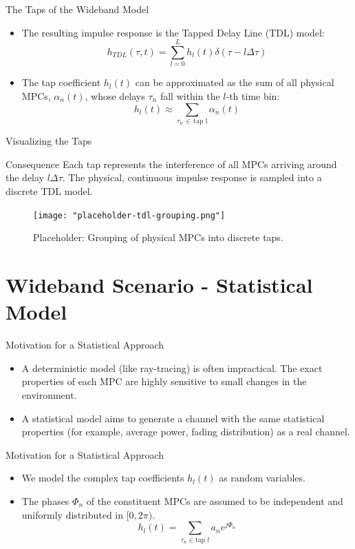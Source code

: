 \documentclass{beamer}
\begin{document}
	\begin{frame}{The Taps of the Wideband Model}
		\begin{itemize}
			\item The resulting impulse response is the Tapped Delay Line (TDL) model:
			\[ h_{TDL}(\tau, t) = \sum_{l=0}^{L} h_l(t) \delta(\tau - l\Delta\tau) \]
			
			\item The tap coefficient $h_l(t)$ can be approximated as the sum of all physical MPCs, $\alpha_n(t)$, whose delays $\tau_n$ fall within the $l$-th time bin:
			\[ h_l(t) \approx \sum_{\tau_n \, \in \, \text{tap l}} \alpha_n(t) \]
		\end{itemize}
	\end{frame}
	
	\begin{frame}{Visualizing the Taps}
		\begin{block}{Consequence}
			Each tap represents the interference of all MPCs arriving around the delay $l\Delta\tau$. The physical, continuous impulse response is sampled into a discrete TDL model.
		\end{block}
		\begin{figure}
			\centering
			\texttt{[image: "placeholder-tdl-grouping.png"]}
			\caption{Placeholder: Grouping of physical MPCs into discrete taps.}
		\end{figure}
	\end{frame}
	
	\section{Wideband Scenario - Statistical Model}
	
	\begin{frame}{Motivation for a Statistical Approach}
		\begin{itemize}
			\item A deterministic model (like ray-tracing) is often impractical. The exact properties of each MPC are highly sensitive to small changes in the environment.
			\item A statistical model aims to generate a channel with the same statistical properties (for example, average power, fading distribution) as a real channel.
		\end{itemize}
	\end{frame}
	
	\begin{frame}{Motivation for a Statistical Approach}
		\begin{itemize}
			\item We model the complex tap coefficients $h_l(t)$ as random variables.
			\item The phases $\Phi_n$ of the constituent MPCs are assumed to be independent and uniformly distributed in $[0, 2\pi)$.
			\[ h_l(t) = \sum_{\tau_n \in \text{tap } l} a_n e^{j\Phi_n} \]
		\end{itemize}
	\end{frame}
	
\end{document}
